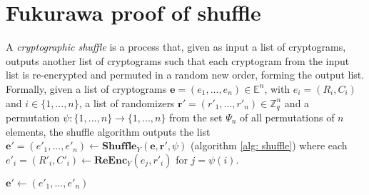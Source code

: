 \section{Fukurawa proof of shuffle}

A \textit{cryptographic shuffle} is a process that, given as input a list of cryptograms, outputs another list of cryptograms such that each cryptogram from the input list is re-encrypted and permuted in a random new order, forming the output list. Formally, given a list of cryptograms \( \boldsymbol{e} = (e_1, ..., e_n) \in \mathbb{E}^n \), with \( e_i = (R_i, C_i) \) and \( i \in \{ 1, ..., n \} \), a list of randomizers \( \boldsymbol{r'} = (r'_1, ..., r'_n) \in \mathbb{Z}_q^n \) and a permutation \( \psi:\{ 1, ..., n \} \rightarrow \{ 1, ..., n \} \) from the set $\Psi_n$ of all permutations of $n$ elements, the shuffle algorithm outputs the list \( \boldsymbol{e'} = (e'_1, ..., e'_n) \leftarrow \mathbf{Shuffle}_Y (\boldsymbol{e}, \boldsymbol{r'}, \psi) \) (algorithm \ref{alg: shuffle}) where each \( e'_i = (R'_i, C'_i) \leftarrow \mathbf{ReEnc}_Y (e_j, r'_i) \) for \( j = \psi(i) \). 

\begin{algorithm}[H]
\DontPrintSemicolon
    \caption{\( \mathbf{Shuffle}_Y (\boldsymbol{e}, \boldsymbol{r'}, \psi) \)}
    \( \boldsymbol{e'} \gets (e'_1, ..., e'_n) \) \\
     
\end{algorithm}

